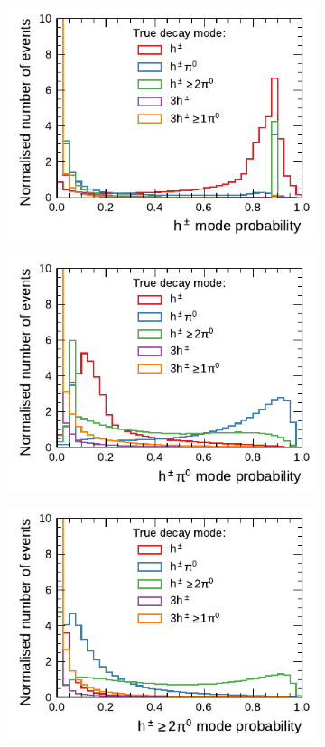 \begin{figure}[!ht]
  \begin{subfigure}{0.48\textwidth}
    \centering
    \includegraphics{./figures/decay_mode_classification/mode_proba_baseline_ptcut_1_5/proba_1p0n.pdf}
  \end{subfigure}\hfill
  \begin{subfigure}{0.48\textwidth}
    \centering
    \includegraphics{./figures/decay_mode_classification/mode_proba_baseline_ptcut_1_5/proba_1p1n.pdf}
  \end{subfigure}
  \begin{subfigure}{0.48\textwidth}
    \centering
    \includegraphics{./figures/decay_mode_classification/mode_proba_baseline_ptcut_1_5/proba_1pXn.pdf}

\end{subfigure}
\end{figure}
